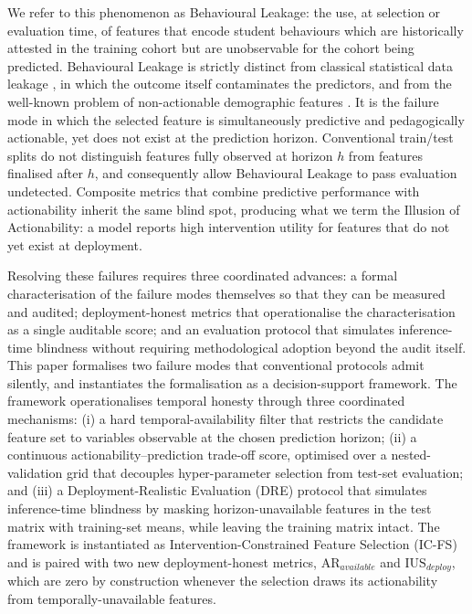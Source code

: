 \documentclass[a4paper,fleqn]{cas-sc}
\begin{document}
We refer to this phenomenon as Behavioural Leakage: the use, at selection or evaluation time, of features that encode student behaviours which are historically attested in the training cohort but are unobservable for the cohort being predicted. Behavioural Leakage is strictly distinct from classical statistical data leakage \citep{kaufman2012,kapoor2023}, in which the outcome itself contaminates the predictors, and from the well-known problem of non-actionable demographic features \citep{baker2014}. It is the failure mode in which the selected feature is simultaneously predictive and pedagogically actionable, yet does not exist at the prediction horizon. Conventional
train/test splits do not distinguish features fully observed at horizon $h$ from features finalised after $h$, and consequently allow Behavioural Leakage to pass evaluation undetected. Composite metrics that combine predictive performance with actionability inherit the same blind spot, producing what we term the Illusion of Actionability: a model reports high intervention utility for features that do not yet exist at deployment.

Resolving these failures requires three coordinated advances: a formal characterisation of the failure modes themselves so that they can be measured and audited; deployment-honest metrics that operationalise the characterisation as a single auditable score; and an evaluation protocol that simulates inference-time blindness without requiring methodological adoption beyond the audit itself. This paper formalises two failure modes that conventional protocols admit silently, and instantiates the formalisation as a decision-support framework. The framework operationalises temporal honesty through three coordinated mechanisms: (i) a hard temporal-availability filter that restricts the candidate feature set to variables observable at the chosen prediction horizon; (ii) a continuous actionability--prediction trade-off score, optimised over a nested-validation grid that decouples hyper-parameter selection from test-set evaluation; and (iii) a Deployment-Realistic Evaluation (DRE) protocol that simulates inference-time blindness by masking horizon-unavailable features in the test matrix with training-set means, while leaving the training matrix intact. The framework is instantiated as Intervention-Constrained Feature Selection (IC-FS) and is paired with two new deployment-honest metrics, $\mathrm{AR}_{available}$ and $\mathrm{IUS}_{deploy}$, which are zero by construction whenever the selection draws its actionability from temporally-unavailable features.
\end{document}
